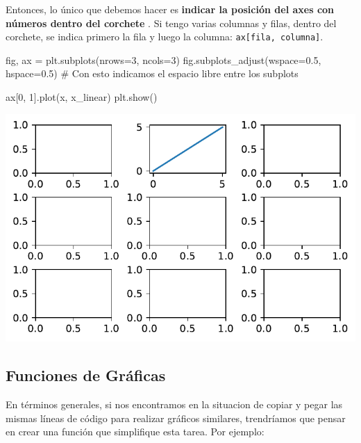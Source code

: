 \documentclass[
  letterpaper,
  DIV=11,
  numbers=noendperiod]{scrreprt}
\newenvironment{Shaded}{\begin{snugshade}}{\end{snugshade}}
\newcommand{\CommentTok}[1]{\textcolor[rgb]{0.37,0.37,0.37}{#1}}
\newcommand{\DecValTok}[1]{\textcolor[rgb]{0.68,0.00,0.00}{#1}}
\newcommand{\FloatTok}[1]{\textcolor[rgb]{0.68,0.00,0.00}{#1}}
\newcommand{\NormalTok}[1]{\textcolor[rgb]{0.00,0.23,0.31}{#1}}
\newcommand{\OperatorTok}[1]{\textcolor[rgb]{0.37,0.37,0.37}{#1}}
\begin{document}
Entonces, lo único que debemos hacer es \textbf{indicar la posición del
axes con números dentro del corchete} . Si tengo varias columnas y
filas, dentro del corchete, se indica primero la fila y luego la
columna: \texttt{ax{[}fila,\ columna{]}}.

\begin{Shaded}
\begin{Highlighting}[]
\NormalTok{fig, ax }\OperatorTok{=}\NormalTok{ plt.subplots(nrows}\OperatorTok{=}\DecValTok{3}\NormalTok{, ncols}\OperatorTok{=}\DecValTok{3}\NormalTok{)}
\NormalTok{fig.subplots\_adjust(wspace}\OperatorTok{=}\FloatTok{0.5}\NormalTok{, hspace}\OperatorTok{=}\FloatTok{0.5}\NormalTok{) }\CommentTok{\# Con esto indicamos el espacio libre entre los subplots}

\NormalTok{ax[}\DecValTok{0}\NormalTok{, }\DecValTok{1}\NormalTok{].plot(x, x\_linear)}
\NormalTok{plt.show()}
\end{Highlighting}
\end{Shaded}

\includegraphics{unidad_6_files/figure-pdf/cell-125-output-1.pdf}

\subsection{Funciones de Gráficas}\label{funciones-de-gruxe1ficas}

En términos generales, si nos encontramos en la situacion de copiar y
pegar las mismas líneas de código para realizar gráficos similares,
trendríamos que pensar en crear una función que simplifique esta tarea.
Por ejemplo:
\end{document}
